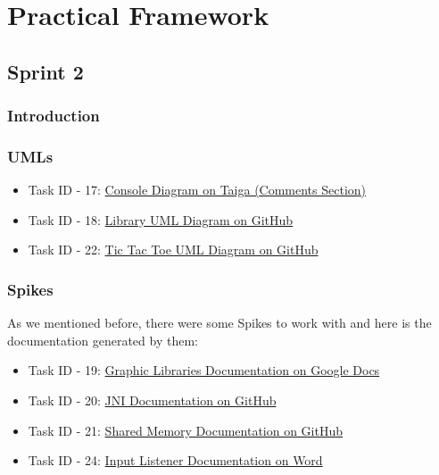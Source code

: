 \section{Practical Framework}


\subsection{Sprint 2}

\subsubsection{Introduction}



\subsubsection{UMLs}



\begin{itemize}
    \item Task ID - 17: \href{https://tree.taiga.io/project/joseluis-teran-coffeetime/us/17?milestone=392128}{Console Diagram on Taiga (Comments Section)}
    \item Task ID - 18: \href{https://github.com/Pending-Name-21/arquitecture/pull/2}{Library UML Diagram on GitHub}
    \item Task ID - 22: \href{https://github.com/Pending-Name-21/arquitecture/pull/3}{Tic Tac Toe UML Diagram on GitHub}
\end{itemize}

\subsubsection{Spikes}

As we mentioned before, there were some Spikes to work with and here is the documentation generated by them:

\begin{itemize}    
    \item Task ID - 19: \href{https://docs.google.com/document/d/1a6wyQA0LM5thyAfOsWnkG-fTLcThvrsVPOGmFcoqkvw/edit?usp=sharing}{Graphic Libraries Documentation on Google Docs}
    \item Task ID - 20: \href{https://github.com/Pending-Name-21/console/tree/vm-spikes/jni_spike}{JNI Documentation on GitHub}
    \item Task ID - 21: \href{https://github.com/Pending-Name-21/console/blob/vm-spikes/shared-memory/README.md}{Shared Memory Documentation on GitHub}
    \item Task ID - 24: \href{https://universidadsalesian-my.sharepoint.com/:w:/g/personal/axel_ayala_9412013_usalesiana_edu_bo/EZlHobuXqW5AmffmDNnGaKYBdpordz1QlVJk88Pe_6S7HQ?e=DymfMq}{Input Listener Documentation on Word}
\end{itemize}

